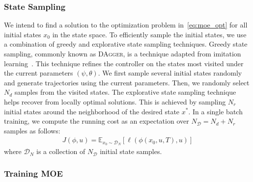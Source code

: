 \subsubsection{State Sampling}

We intend to find a solution to the optimization problem
in~\eqref{eq:moe_opt} for all initial states $x_0$ in the
state space.
%
To efficiently sample the initial states, we use a combination of greedy and
explorative state sampling techniques.
%
Greedy state sampling, commonly known as \textsc{DAgger}, is a technique
adapted from imitation learning~\cite{ross2011no}.
%
This technique refines the controller on the states most visited under the
current parameters $(\psi, \theta)$.
%
We first sample several initial states randomly and generate trajectories using
the current parameters.
%
Then, we randomly select $N_d$ samples from the visited states. 
%
The explorative state sampling technique helps recover from locally optimal
solutions. 
%
This is achieved by sampling $N_r$ initial states around the neighborhood of the
desired state $x^*$.
%
In a single batch training, we compute the running cost as an expectation
over $N_{\mathcal{D}} = N_d+N_r$ samples as follows:
\begin{align*}
    J(\phi, u) = \mathbb{E}_{x_0 \sim \mathcal{D}_N}[ \ell(\phi(x_0, u, T), u)]
\end{align*}
\noindent where $\mathcal{D}_N$ is a collection of $N_{\mathcal{D}}$ initial state samples.

\subsubsection{Training MOE}
\label{sssec:training_moe}

